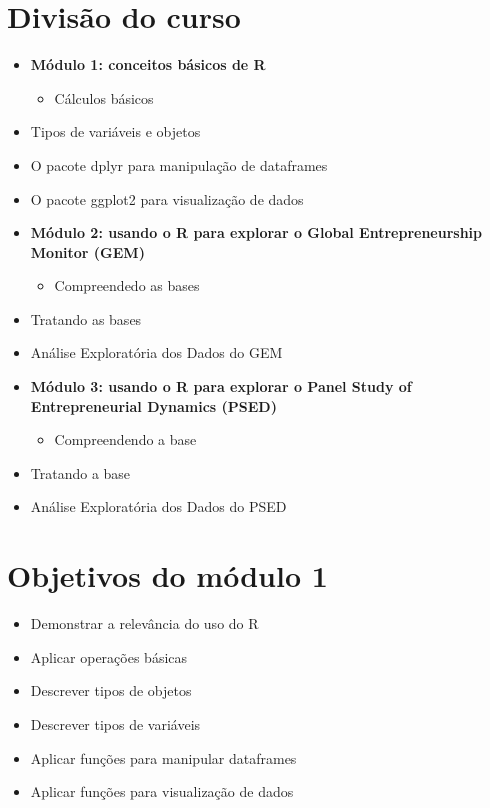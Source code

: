 \documentclass[
]{article}
\providecommand{\tightlist}{%
  \setlength{\itemsep}{0pt}\setlength{\parskip}{0pt}}
\begin{document}
\hypertarget{divisuxe3o-do-curso}{%
\section{Divisão do curso}\label{divisuxe3o-do-curso}}

\begin{itemize}
\tightlist
\item
  \textbf{Módulo 1: conceitos básicos de R}

  \begin{itemize}
  \tightlist
  \item
    Cálculos básicos
  \end{itemize}
\item
  Tipos de variáveis e objetos
\item
  O pacote dplyr para manipulação de dataframes
\item
  O pacote ggplot2 para visualização de dados
\item
  \textbf{Módulo 2: usando o R para explorar o Global Entrepreneurship
  Monitor (GEM)}

  \begin{itemize}
  \tightlist
  \item
    Compreendedo as bases
  \end{itemize}
\item
  Tratando as bases
\item
  Análise Exploratória dos Dados do GEM
\item
  \textbf{Módulo 3: usando o R para explorar o Panel Study of
  Entrepreneurial Dynamics (PSED)}

  \begin{itemize}
  \tightlist
  \item
    Compreendendo a base
  \end{itemize}
\item
  Tratando a base
\item
  Análise Exploratória dos Dados do PSED
\end{itemize}

\hypertarget{objetivos-do-muxf3dulo-1}{%
\section{Objetivos do módulo 1}\label{objetivos-do-muxf3dulo-1}}

\begin{itemize}
\tightlist
\item
  Demonstrar a relevância do uso do R
\item
  Aplicar operações básicas
\item
  Descrever tipos de objetos
\item
  Descrever tipos de variáveis
\item
  Aplicar funções para manipular dataframes
\item
  Aplicar funções para visualização de dados
\end{itemize}
\end{document}
